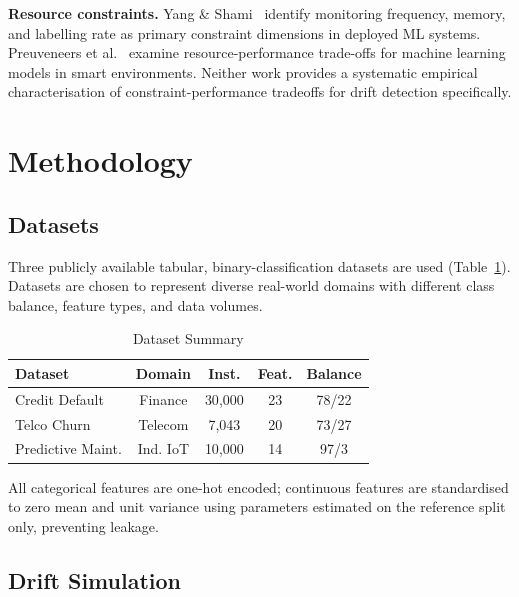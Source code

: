 \documentclass[conference]{IEEEtran}
\begin{document}
\textbf{Resource constraints.} Yang \& Shami~\cite{yang2021} identify monitoring frequency, memory, and labelling rate as primary constraint dimensions in deployed ML systems. Preuveneers et al.~\cite{preuveneers2020} examine resource-performance trade-offs for machine learning models in smart environments. Neither work provides a systematic empirical characterisation of constraint-performance tradeoffs for drift detection specifically.

\section{Methodology}

\subsection{Datasets}

Three publicly available tabular, binary-classification datasets are used (Table~\ref{tab:datasets}). Datasets are chosen to represent diverse real-world domains with different class balance, feature types, and data volumes.

\begin{table}[htbp]
\caption{Dataset Summary}
\label{tab:datasets}
\centering
\small
\setlength{\tabcolsep}{4pt}
\begin{tabular}{lcccc}
\toprule
Dataset & Domain & Inst. & Feat. & Balance \\
\midrule
Credit Default    & Finance  & 30{,}000 & 23 & 78/22 \\
Telco Churn       & Telecom  & 7{,}043  & 20 & 73/27 \\
Predictive Maint. & Ind. IoT & 10{,}000 & 14 & 97/3 \\
\bottomrule
\end{tabular}
\end{table}

All categorical features are one-hot encoded; continuous features are standardised to zero mean and unit variance using parameters estimated on the reference split only, preventing leakage.

\subsection{Drift Simulation}
\end{document}
